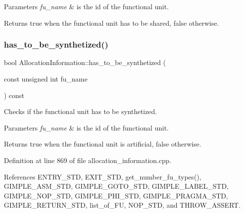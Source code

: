 \begin{DoxyParams}{Parameters}
{\em fu\+\_\+name} & is the id of the functional unit. \\
\hline
\end{DoxyParams}
\begin{DoxyReturn}{Returns}
true when the functional unit has to be shared, false otherwise. 
\end{DoxyReturn}
\mbox{\label{classAllocationInformation_a396f27c9f8392246c8e652dd6501f59c}} 
\subsubsection{\texorpdfstring{has\+\_\+to\+\_\+be\+\_\+synthetized()}{has\_to\_be\_synthetized()}}
{\footnotesize\ttfamily bool Allocation\+Information\+::has\+\_\+to\+\_\+be\+\_\+synthetized (\begin{DoxyParamCaption}\item[{const unsigned int}]{fu\+\_\+name }\end{DoxyParamCaption}) const}



Checks if the functional unit has to be synthetized. 


\begin{DoxyParams}{Parameters}
{\em fu\+\_\+name} & is the id of the functional unit. \\
\hline
\end{DoxyParams}
\begin{DoxyReturn}{Returns}
true when the functional unit is artificial, false otherwise. 
\end{DoxyReturn}


Definition at line 869 of file allocation\+\_\+information.\+cpp.



References E\+N\+T\+R\+Y\+\_\+\+S\+TD, E\+X\+I\+T\+\_\+\+S\+TD, get\+\_\+number\+\_\+fu\+\_\+types(), G\+I\+M\+P\+L\+E\+\_\+\+A\+S\+M\+\_\+\+S\+TD, G\+I\+M\+P\+L\+E\+\_\+\+G\+O\+T\+O\+\_\+\+S\+TD, G\+I\+M\+P\+L\+E\+\_\+\+L\+A\+B\+E\+L\+\_\+\+S\+TD, G\+I\+M\+P\+L\+E\+\_\+\+N\+O\+P\+\_\+\+S\+TD, G\+I\+M\+P\+L\+E\+\_\+\+P\+H\+I\+\_\+\+S\+TD, G\+I\+M\+P\+L\+E\+\_\+\+P\+R\+A\+G\+M\+A\+\_\+\+S\+TD, G\+I\+M\+P\+L\+E\+\_\+\+R\+E\+T\+U\+R\+N\+\_\+\+S\+TD, list\+\_\+of\+\_\+\+FU, N\+O\+P\+\_\+\+S\+TD, and T\+H\+R\+O\+W\+\_\+\+A\+S\+S\+E\+RT.



